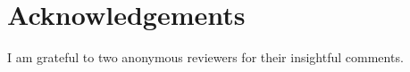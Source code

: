 \documentclass[output=paper,
modfonts,
newtxmath,
hidelinks,
]{langscibook}
\begin{document}
\section*{Acknowledgements}

I am grateful to two anonymous reviewers for their insightful comments.

\sloppy
\printbibliography[heading=subbibliography,notkeyword=this]
\end{document}
